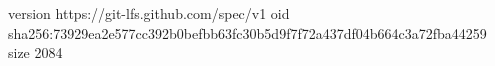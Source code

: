 version https://git-lfs.github.com/spec/v1
oid sha256:73929ea2e577cc392b0befbb63fc30b5d9f7f72a437df04b664c3a72fba44259
size 2084
